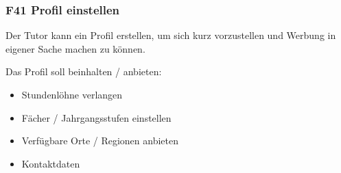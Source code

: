 \documentclass[10pt,a4paper]{scrartcl}
\begin{document}
\subsubsection*{F41 Profil einstellen}
Der Tutor kann ein Profil erstellen, um sich kurz vorzustellen und Werbung in eigener Sache machen zu können.

Das Profil soll beinhalten / anbieten:
\begin{itemize}
	\item Stundenlöhne verlangen
	\item Fächer / Jahrgangsstufen einstellen
	\item Verfügbare Orte / Regionen anbieten
	\item Kontaktdaten
\end{itemize}

%

%

%
\end{document}
